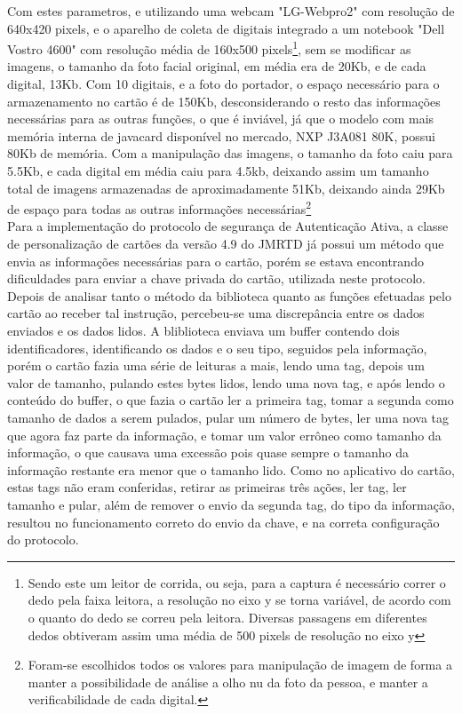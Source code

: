 \documentclass{article}
\begin{document}
\begin{justify}
		\hspace*{2cm}Com estes parametros, e utilizando uma webcam "LG-Webpro2" com resolução de 640x420 pixels, e o aparelho de coleta de digitais integrado a um notebook "Dell Vostro 4600" com resolução média de 160x500 pixels\footnote{Sendo este um leitor de corrida, ou seja, para a captura é necessário correr o dedo pela faixa leitora, a resolução no eixo y se torna variável, de acordo com o quanto do dedo se correu pela leitora. Diversas passagens em diferentes dedos obtiveram assim uma média de 500 pixels de resolução no eixo y}, sem se modificar as imagens, o tamanho da foto facial original, em média era de 20Kb, e de cada digital, 13Kb. Com 10 digitais, e a foto do portador, o espaço necessário para o armazenamento no cartão é de 150Kb, desconsiderando o resto das informações necessárias para as outras funções, o que é inviável, já que o modelo com mais memória interna de javacard disponível no mercado, NXP J3A081 80K, possui 80Kb de memória. Com a manipulação das imagens, o tamanho da foto caiu para 5.5Kb, e cada digital em média caiu para 4.5kb, deixando assim um tamanho total de imagens armazenadas de aproximadamente 51Kb, deixando ainda 29Kb de espaço para todas as outras informações necessárias\footnote{Foram-se escolhidos todos os valores para manipulação de imagem de forma a manter a possibilidade de análise a olho nu da foto da pessoa, e manter a verificabilidade de cada digital.}\\
		\hspace*{2cm}Para a implementação do protocolo de segurança de Autenticação Ativa, a classe de personalização de cartões da versão 4.9 do JMRTD já possui um método que envia as informações necessárias para o cartão, porém se estava encontrando dificuldades para enviar a chave privada do cartão, utilizada neste protocolo. Depois de analisar tanto o método da biblioteca quanto as funções efetuadas pelo cartão ao receber tal instrução, percebeu-se uma discrepância entre os dados enviados e os dados lidos. A bliblioteca enviava um buffer contendo dois identificadores, identificando os dados e o seu tipo, seguidos pela informação, porém o cartão fazia uma série de leituras a mais, lendo uma tag, depois um valor de tamanho, pulando estes bytes lidos, lendo uma nova tag, e após lendo o conteúdo do buffer, o que fazia o cartão ler a primeira tag, tomar a segunda como tamanho de dados a serem pulados, pular um número de bytes, ler uma nova tag que agora faz parte da informação, e tomar um valor errôneo como tamanho da informação, o que causava uma excessão pois quase sempre o tamanho da informação restante era menor que o tamanho lido. Como no aplicativo do cartão, estas tags não eram conferidas, retirar as primeiras três ações, ler tag, ler tamanho e pular, além de remover o envio da segunda tag, do tipo da informação, resultou no funcionamento correto do envio da chave, e na correta configuração do protocolo.


		\end{justify}
\end{document}
